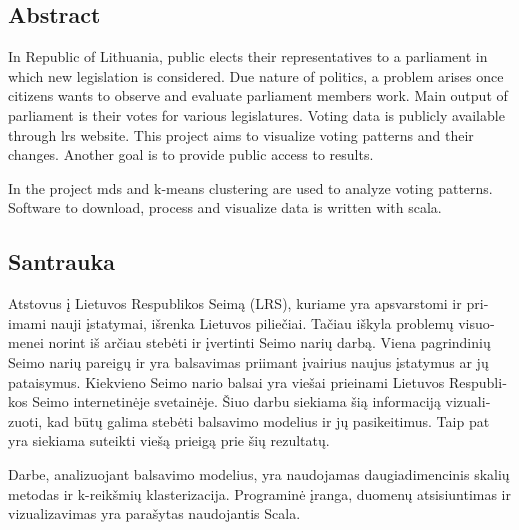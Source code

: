 \documentclass[a4paper,12pt]{article}
\begin{document}
   
    
    
    \begin{center}
        \section*{Abstract}
    \end{center}
	
        
        
        In Republic of Lithuania, public elects their representatives to a parliament in which new legislation is considered. Due nature of politics, a problem arises once citizens wants to observe and evaluate parliament members work. Main output of parliament is their votes for various legislatures. Voting data is publicly available through \gls{lrs} website. This project aims to visualize voting patterns and their changes. Another goal is to provide public access to results.
        
        In the project \gls{mds} and \gls{k-means} clustering are used to analyze voting patterns. Software to download, process and visualize  data is written with \gls{scala}.
        

    \clearpage
    
    \begin{center}
    	\section*{Santrauka}
    \end{center}
    
    
    \begin{otherlanguage}{lithuanian}
    	Atstovus į Lietuvos Respublikos Seimą (LRS), kuriame yra apsvarstomi ir priimami nauji įstatymai, išrenka Lietuvos piliečiai. Tačiau iškyla problemų visuomenei norint iš arčiau stebėti ir įvertinti Seimo narių darbą. Viena pagrindinių Seimo narių pareigų ir yra balsavimas priimant įvairius naujus įstatymus ar jų pataisymus. Kiekvieno Seimo nario balsai yra viešai prieinami Lietuvos Respublikos Seimo internetinėje svetainėje. Šiuo darbu siekiama šią informaciją vizualizuoti, kad būtų galima stebėti balsavimo modelius ir jų pasikeitimus. Taip pat yra siekiama suteikti viešą prieigą prie šių rezultatų.
    	
    	Darbe, analizuojant balsavimo modelius, yra naudojamas daugiadimencinis skalių metodas ir k-reikšmių klasterizacija. Programinė įranga, duomenų atsisiuntimas ir vizualizavimas yra parašytas naudojantis Scala.
    	
    \end{otherlanguage}
\end{document}
